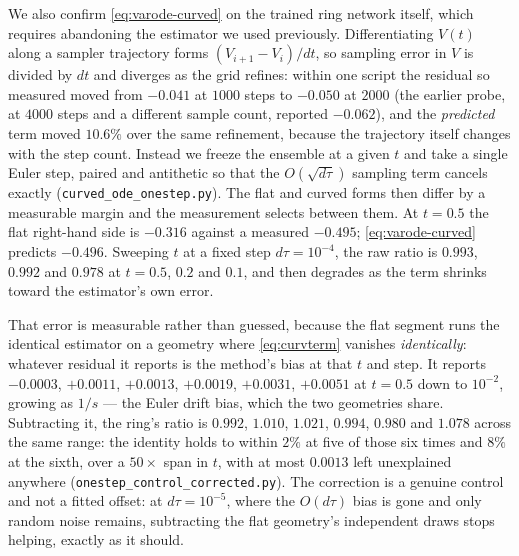 \documentclass[11pt]{article}
\theoremstyle{remark}
\begin{document}
We also confirm \eqref{eq:varode-curved} on the trained ring network itself, which requires
abandoning the estimator we used previously. Differentiating $V(t)$ along a sampler
trajectory forms $(V_{i+1}-V_i)/dt$, so sampling error in $V$ is divided by $dt$ and
diverges as the grid refines: within one script the residual so measured moved from
$-0.041$ at $1000$ steps to $-0.050$ at $2000$ (the earlier probe, at $4000$ steps and a
different sample count, reported $-0.062$), and the \emph{predicted} term moved $10.6\%$
over the same refinement, because the trajectory itself changes with the step count. Instead we freeze the ensemble at a given $t$
and take a single Euler step, paired and antithetic so that the $O(\sqrt{d\tau})$ sampling
term cancels exactly (\texttt{curved\_ode\_onestep.py}). The flat and curved forms then
differ by a measurable margin and the measurement selects between them. At $t=0.5$ the flat
right-hand side is $-0.316$ against a measured $-0.495$; \eqref{eq:varode-curved} predicts
$-0.496$. Sweeping $t$ at a fixed step $d\tau=10^{-4}$, the raw ratio is $0.993$, $0.992$
and $0.978$ at $t=0.5$, $0.2$ and $0.1$, and then degrades as the term shrinks toward the
estimator's own error.

That error is measurable rather than guessed, because the flat segment runs the identical
estimator on a geometry where \eqref{eq:curvterm} vanishes \emph{identically}: whatever
residual it reports is the method's bias at that $t$ and step. It reports $-0.0003$,
$+0.0011$, $+0.0013$, $+0.0019$, $+0.0031$, $+0.0051$ at $t=0.5$ down to $10^{-2}$, growing
as $1/s$ --- the Euler drift bias, which the two geometries share. Subtracting it, the ring's
ratio is $0.992$, $1.010$, $1.021$, $0.994$, $0.980$ and $1.078$ across the same range: the
identity holds to within $2\%$ at five of those six times and $8\%$ at the sixth, over a
$50\times$ span in $t$, with at most $0.0013$ left unexplained anywhere
(\texttt{onestep\_control\_corrected.py}). The correction is a genuine control and not a
fitted offset: at $d\tau=10^{-5}$, where the $O(d\tau)$ bias is gone and only random noise
remains, subtracting the flat geometry's independent draws stops helping, exactly as it
should.
\end{document}
